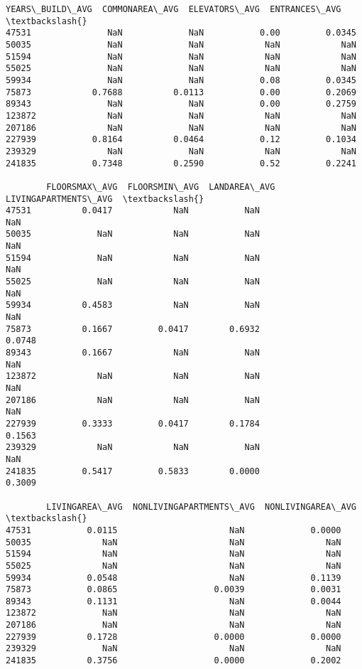 \documentclass[11pt]{article}
\begin{document}
\begin{tcolorbox}[breakable, size=fbox, boxrule=.5pt, pad at break*=1mm, opacityfill=0]
\begin{Verbatim}[commandchars=\\\{\}]
        YEARS\_BUILD\_AVG  COMMONAREA\_AVG  ELEVATORS\_AVG  ENTRANCES\_AVG  \textbackslash{}
47531               NaN             NaN           0.00         0.0345
50035               NaN             NaN            NaN            NaN
51594               NaN             NaN            NaN            NaN
55025               NaN             NaN            NaN            NaN
59934               NaN             NaN           0.08         0.0345
75873            0.7688          0.0113           0.00         0.2069
89343               NaN             NaN           0.00         0.2759
123872              NaN             NaN            NaN            NaN
207186              NaN             NaN            NaN            NaN
227939           0.8164          0.0464           0.12         0.1034
239329              NaN             NaN            NaN            NaN
241835           0.7348          0.2590           0.52         0.2241

        FLOORSMAX\_AVG  FLOORSMIN\_AVG  LANDAREA\_AVG  LIVINGAPARTMENTS\_AVG  \textbackslash{}
47531          0.0417            NaN           NaN                   NaN
50035             NaN            NaN           NaN                   NaN
51594             NaN            NaN           NaN                   NaN
55025             NaN            NaN           NaN                   NaN
59934          0.4583            NaN           NaN                   NaN
75873          0.1667         0.0417        0.6932                0.0748
89343          0.1667            NaN           NaN                   NaN
123872            NaN            NaN           NaN                   NaN
207186            NaN            NaN           NaN                   NaN
227939         0.3333         0.0417        0.1784                0.1563
239329            NaN            NaN           NaN                   NaN
241835         0.5417         0.5833        0.0000                0.3009

        LIVINGAREA\_AVG  NONLIVINGAPARTMENTS\_AVG  NONLIVINGAREA\_AVG  \textbackslash{}
47531           0.0115                      NaN             0.0000
50035              NaN                      NaN                NaN
51594              NaN                      NaN                NaN
55025              NaN                      NaN                NaN
59934           0.0548                      NaN             0.1139
75873           0.0865                   0.0039             0.0031
89343           0.1131                      NaN             0.0044
123872             NaN                      NaN                NaN
207186             NaN                      NaN                NaN
227939          0.1728                   0.0000             0.0000
239329             NaN                      NaN                NaN
241835          0.3756                   0.0000             0.2002


\end{Verbatim}
\end{tcolorbox}
\end{document}
